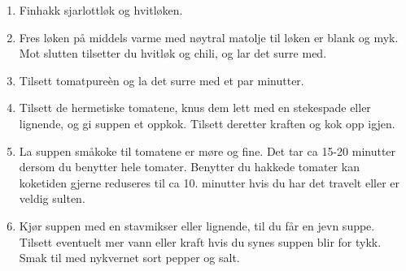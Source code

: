 \begin{enumerate}
    \item 
    Finhakk sjarlottløk og hvitløken.
    
    \item 
    Fres løken på middels varme med nøytral matolje til løken er blank og myk. 
    Mot slutten tilsetter du hvitløk og chili, og lar det surre med. 
    
    \item 
    Tilsett tomatpureèn og la det surre med et par minutter.

    \item 
    Tilsett de hermetiske tomatene, knus dem lett med en stekespade eller lignende, og gi suppen et oppkok. Tilsett deretter kraften og kok opp igjen. 

    \item
    La suppen småkoke til tomatene er møre og fine. Det tar ca 15-20 minutter dersom du benytter hele tomater. Benytter du hakkede tomater kan koketiden gjerne reduseres til ca 10. minutter hvis du har det travelt eller er veldig sulten. 
    
    \item 
    Kjør suppen med en stavmikser eller lignende, til du får en jevn suppe. Tilsett eventuelt mer vann eller kraft hvis du synes suppen blir for tykk. Smak til med nykvernet sort pepper og salt.
    
\end{enumerate}
